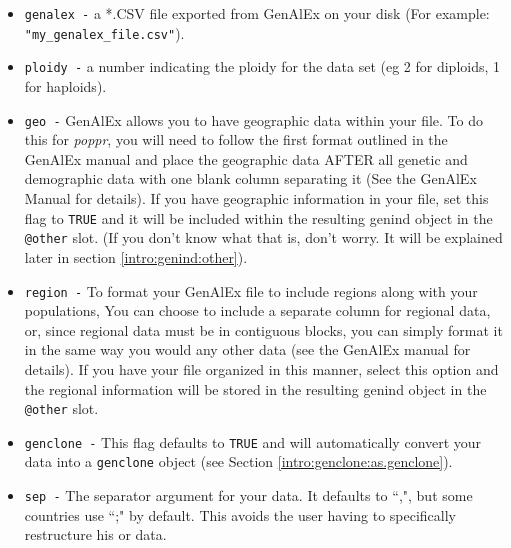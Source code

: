 \documentclass[letterpaper]{article}\usepackage[]{graphicx}\usepackage[]{color}
\begin{document}
\begin{itemize}
  \item \texttt{genalex -} a *.CSV file exported from GenAlEx on your disk (For example: \texttt{"my\_genalex\_file.csv"}).
  \item \texttt{ploidy -} a number indicating the ploidy for the data set (eg 2 for diploids, 1 for haploids).
  \item \texttt{geo -} GenAlEx allows you to have geographic data within your file. To do this for \textit{poppr}, you will need to follow the first format outlined in the GenAlEx manual and place the geographic data AFTER all genetic and demographic data with one blank column separating it (See the GenAlEx Manual for details). If you have geographic information in your file, set this flag to \texttt{TRUE} and it will be included within the resulting genind object in the \texttt{@other} slot. (If you don't know what that is, don't worry. It will be explained later in section \ref{intro:genind:other}).
  \item \texttt{region -} To format your GenAlEx file to include regions along with your populations, You can choose to include a separate column for regional data, or, since regional data must be in contiguous blocks, you can simply format it in the same way you would any other data (see the GenAlEx manual for details). If you have your file organized in this manner, select this option and the regional information will be stored in the resulting genind object in the \texttt{@other} slot.
  \item \texttt{genclone -} This flag defaults to \texttt{TRUE} and will automatically convert your data into a \texttt{genclone} object (see Section \ref{intro:genclone:as.genclone}).
  \item \texttt{sep -} The separator argument for your data. It defaults to ``,", but some countries use ``;" by default. This avoids the user having to
  specifically restructure his or data.
\end{itemize}

\begin{center}
\end{center}
\end{document}
